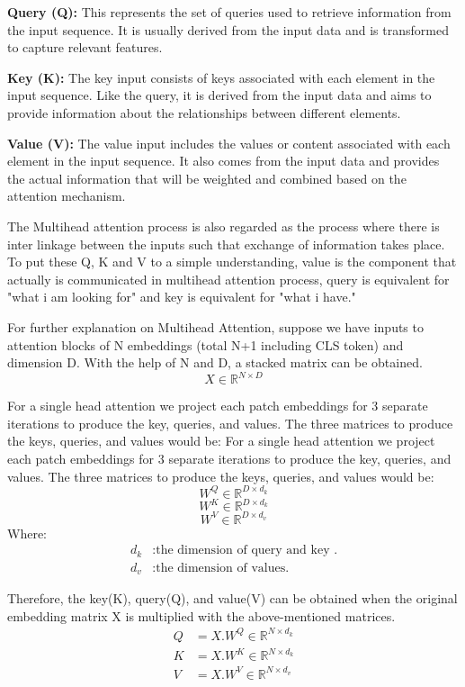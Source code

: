 \noindent \textbf{Query (Q):} This represents the set of queries used to retrieve information from the input sequence. It is usually derived from the input data and is transformed to capture relevant features.

\noindent \textbf{Key (K):} The key input consists of keys associated with each element in the input sequence. Like the query, it is derived from the input data and aims to provide information about the relationships between different elements.

\noindent \textbf{Value (V):} The value input includes the values or content associated with each element in the input sequence. It also comes from the input data and provides the actual information that will be weighted and combined based on the attention mechanism.

\noindent The Multihead attention process is also regarded as the process where there is inter linkage between the inputs such that exchange of information takes place. To put these Q, K and V to a simple understanding, value is the component that actually is communicated in multihead attention process, query is equivalent for "what i am looking for" and key is equivalent for "what i have."

\noindent For further explanation on Multihead Attention, suppose we have inputs to attention blocks of N embeddings (total N+1 including CLS token) and dimension D. With the help of N and D, a stacked matrix can be obtained.
\[ X \in \mathbb{R}^{N \times D}\]

\noindent For a single head attention we project each patch embeddings for 3 separate iterations to produce the key, queries, and values. The three matrices to produce the keys, queries, and values would be:
\noindent For a single head attention we project each patch embeddings for 3 separate iterations to produce the key, queries, and values. The three matrices to produce the keys, queries, and values would be:
\[ W^Q \in \mathbb{R}^{D\times d_k}\]
\[ W^K \in \mathbb{R}^{D \times d_k}\]
\[ W^V \in \mathbb{R}^{D \times d_v}\]
Where:
\begin{align*}
    d_k & : \text{the dimension of query and key .} \\
    d_v & : \text{the dimension of values.}
\end{align*}

\noindent Therefore, the key(K), query(Q), and value(V) can be obtained when the original embedding matrix X is multiplied with the above-mentioned matrices.
\begin{align}
    Q & = X.W^Q \in \mathbb{R}^{N\times d_k} \\
    K & = X.W^K \in \mathbb{R}^{N\times d_k} \\
    V & = X.W^V \in \mathbb{R}^{N\times d_v}
\end{align}

